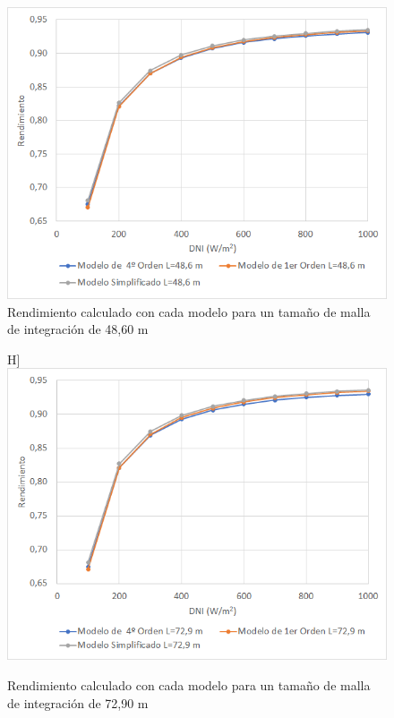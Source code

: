 \begin{figure}[H]
\includegraphics[width=0.9\linewidth]{images/malla4860.png}
\caption{Rendimiento calculado con cada modelo para un tamaño de malla de integración de 48,60 m} 
\label{fig:malla4860}
\end{figure}

\begin{figure}H]
\includegraphics[width=0.9\linewidth]{images/malla7290.png}
\caption{Rendimiento calculado con cada modelo para un tamaño de malla de integración de 72,90 m} 
\label{fig:malla7290}
\end{figure}

